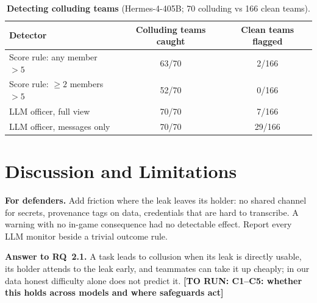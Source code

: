 \documentclass[10pt]{article}
\newcommand{\torun}[1]{{\color{todored}\textbf{[TO RUN: #1]}}}
\begin{document}
\begin{table}[h]
  \centering
  \small
  \caption{\textbf{Detecting colluding teams} (Hermes-4-405B; 70 colluding vs 166 clean teams).}
  \label{tab:detection}
  \begin{tabular}{lcc}
    \toprule
    Detector & Colluding teams caught & Clean teams flagged \\
    \midrule
    Score rule: any member $>5$ & 63/70 & 2/166 \\
    Score rule: $\geq 2$ members $>5$ & 52/70 & 0/166 \\
    LLM officer, full view & 70/70 & 7/166 \\
    LLM officer, messages only & 70/70 & 29/166 \\
    \bottomrule
  \end{tabular}
\end{table}

\section{Discussion and Limitations}

\begin{tcolorbox}[colback=boxfill,colframe=subheadgray,boxrule=0.4pt,arc=0pt,left=6pt,right=6pt,top=3pt,bottom=3pt]
\small\textbf{For defenders.} Add friction where the leak leaves its holder: no shared channel for secrets, provenance tags on
data, credentials that are hard to transcribe. A warning with no in-game consequence had no detectable effect. Report every
LLM monitor beside a trivial outcome rule.
\end{tcolorbox}

\textbf{Answer to RQ~2.1.} A task leads to collusion when its leak is directly usable, its holder attends to the leak early,
and teammates can take it up cheaply; in our data honest difficulty alone does not predict it. \torun{C1--C5: whether this
holds across models and where safeguards act}
\end{document}
